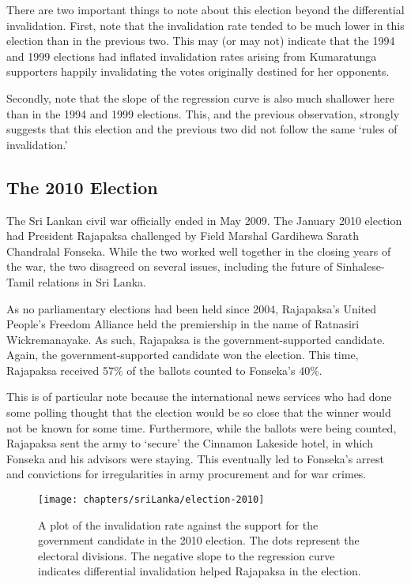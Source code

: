 There are two important things to note about this election beyond the differential invalidation. First, note that the invalidation rate tended to be much lower in this election than in the previous two. This may (or may not) indicate that the 1994 and 1999 elections had inflated invalidation rates arising from Kumaratunga supporters happily invalidating the votes originally destined for her opponents.

Secondly, note that the slope of the regression curve is also much shallower here than in the 1994 and 1999 elections. This, and the previous observation, strongly suggests that this election and the previous two did not follow the same `rules of invalidation.' 







\subsection{The 2010 Election}
The Sri Lankan civil war officially ended in May 2009.\cite{wijaypala-2009} The January 2010 election had President Rajapaksa challenged by Field Marshal Gardihewa Sarath Chandralal Fonseka. While the two worked well together in the closing years of the war, the two disagreed on several issues, including the future of Sinhalese-Tamil relations in Sri Lanka.\cite{hensman-2010,uyangoda-2010}

As no parliamentary elections had been held since 2004, Rajapaksa's United People's Freedom Alliance held the premiership in the name of Ratnasiri Wickremanayake. As such, Rajapaksa is the government-supported candidate. Again, the government-supported candidate won the election. This time, Rajapaksa received 57\% of the ballots counted to Fonseka's 40\%. 

This is of particular note because the international news services who had done some polling thought that the election would be so close that the winner would not be known for some time.\cite{bbc-20100126} Furthermore, while the ballots were being counted, Rajapaksa sent the army to `secure' the Cinnamon Lakeside hotel, in which Fonseka and his advisors were staying.\cite{bbc-20100127} This eventually led to Fonseka's arrest and convictions for irregularities in army procurement and for war crimes.\cite{bbc-20111118}


\begin{figure}[t]
\texttt{[image: chapters/sriLanka/election-2010]}
\caption[Invalidation plot for the 2010 presidential election]{A plot of the invalidation rate against the support for the government candidate in the 2010 election. The dots represent the electoral divisions. The negative slope to the regression curve indicates differential invalidation helped Rajapaksa in the election. }
\label{fig:sri-elx2010}
\end{figure}


